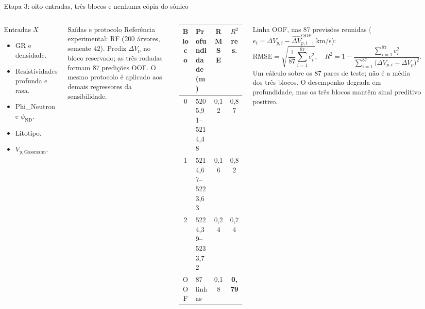 \documentclass[aspectratio=169,10pt]{beamer}
\newcommand{\phiND}{\ensuremath{\phi_{\mathrm{ND}}}}
\newcommand{\dVp}{\ensuremath{\Delta V_{\mathrm{p}}}}
\begin{document}
\begin{frame}{Etapa 3: oito entradas, tr\^es blocos e nenhuma c\'opia do s\^onico}
  \begin{columns}[T,onlytextwidth]
    \begin{block}{Entradas $X$}
      \scriptsize
      \begin{itemize}
        \item GR e densidade.
        \item Resistividades profunda e rasa.
        \item Phi\_Neutron e \phiND{}.
        \item Litotipo.
        \item $V_{\mathrm{p,Gassmann}}$.
      \end{itemize}
    \end{block}
    \begin{exampleblock}{Sa\'idas e protocolo}
      \scriptsize
      Refer\^encia experimental: RF (200 \'arvores, semente 42).
      Prediz \dVp{} no bloco reservado; as tr\^es rodadas formam 87
      predi\c{c}\~oes OOF. O mesmo protocolo \'e aplicado aos demais
      regressores da sensibilidade.
    \end{exampleblock}
    \centering
    \scriptsize
    \begin{tabular}{clcc}
      \toprule
      Bloco & Profundidade (m) & RMSE & $R^2$ res. \\
      \midrule
      0 & 5205,91--5214,48 & 0,12 & 0,87 \\
      1 & 5214,67--5223,63 & 0,16 & 0,82 \\
      2 & 5224,39--5233,72 & 0,24 & 0,74 \\
      \midrule
      OOF & 87 linhas & 0,18 & \textbf{0,79} \\
      \bottomrule
    \end{tabular}\par
    \vspace{0.08cm}
    \raggedright
    {\scriptsize
    Linha OOF, nas 87 previs\~oes reunidas
    ($e_i=\Delta V_{p,i}-\widehat{\Delta V}_{p,i}^{\mathrm{OOF}}$, km/s):
    \[
      \mathrm{RMSE}
      =\sqrt{\frac{1}{87}\sum_{i=1}^{87}e_i^{2}},
      \quad
      R^{2}
      =1-\frac{\sum_{i=1}^{87}e_i^{2}}
      {\sum_{i=1}^{87}
      \bigl(\Delta V_{p,i}-\overline{\Delta V}_{p}\bigr)^{2}}.
    \]
    Um c\'alculo sobre os 87 pares de teste; n\~ao \'e a m\'edia
    dos tr\^es blocos. O desempenho degrada em profundidade, mas
    os tr\^es blocos mant\^em sinal preditivo positivo.}
  \end{columns}
\end{frame}
\end{document}

